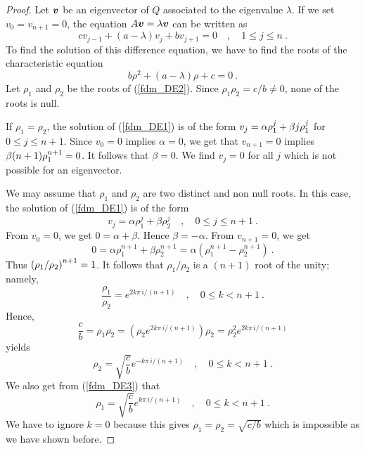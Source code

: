 \begin{proof}
Let $\bm{v}$ be an eigenvector of $Q$ associated to the eigenvalue
$\lambda$.  If we set $v_0 = v_{n+1} = 0$, the equation
$A\bm{v} = \lambda \bm{v}$ can be written as
\begin{equation} \label{fdm_DE1}
c v_{j-1} + (a-\lambda) v_j + b v_{j+1} = 0 \quad ,
\quad 1 \leq j \leq n \ .
\end{equation}
To find the solution of this difference equation, we have to find the
roots of the characteristic equation
\begin{equation} \label{fdm_DE2}
b \rho^2 + (a-\lambda) \rho + c = 0 \ .
\end{equation}
Let $\rho_1$ and $\rho_2$ be the roots of (\ref{fdm_DE2}).
Since $\rho_1\rho_2 = c/b \neq 0$, none of the roots is null.

If $\rho_1 = \rho_2$, the solution of (\ref{fdm_DE1}) is of the form 
$\displaystyle v_j = \alpha \rho_1^j + \beta j \rho_1^j$ for
$0 \leq j \leq n+1$. Since $v_0 = 0$ implies $\alpha=0$, we get that
$v_{n+1} = 0$ implies $\displaystyle \beta (n+1) \rho_1^{n+1} = 0$.
It follows that $\beta=0$.  We find $v_j=0$ for all $j$ which is not
possible for an eigenvector.

We may assume that $\rho_1$ and $\rho_2$ are two distinct and non null
roots.  In this case, the solution of (\ref{fdm_DE1}) is of the form
\begin{equation} \label{fdm_DE4}
v_j = \alpha \rho_1^j + \beta \rho_2^j \quad , \quad 0 \leq j \leq n+1 \ . 
\end{equation}
From $v_0=0$, we get $0=\alpha+\beta$.  Hence $\beta=-\alpha$.  From
$v_{n+1} = 0$, we get
\[
0 = \alpha \rho_1^{n+1} + \beta \rho_2^{n+1}
= \alpha \left( \rho_1^{n+1} -\rho_2^{n+1}\right) \ .
\]
Thus $\displaystyle \left(\rho_1/\rho_2\right)^{n+1} = 1$.
It follows that $\rho_1/\rho_2$ is a $(n+1)$ root of the unity;
namely,
\begin{equation} \label{fdm_DE3}
\frac{\rho_1}{\rho_2} = e^{2k\pi\,i/(n+1)} \quad ,
\quad 0 \leq k < n+1 \ .
\end{equation}
Hence,
\[
\frac{c}{b} = \rho_1\rho_2 = \left(\rho_2 e^{2k\pi\,i/(n+1)}\right)
\rho_2 = \rho_2^2 e^{2k\pi\,i/(n+1)}
\]
yields
\[
\rho_2 =  \sqrt{\frac{c}{b}} e^{-k\pi\,i/(n+1)} \quad ,
\quad 0 \leq k < n+1 \ .
\]
We also get from (\ref{fdm_DE3}) that
\[
\rho_1 =  \sqrt{\frac{c}{b}} e^{k\pi\,i/(n+1)} \quad ,
\quad 0 \leq k < n+1 \ .
\]
We have to ignore $k=0$ because this gives
$\rho_1 = \rho_2 = \sqrt{c/b}$ which is impossible as we have shown before.


\end{proof}
